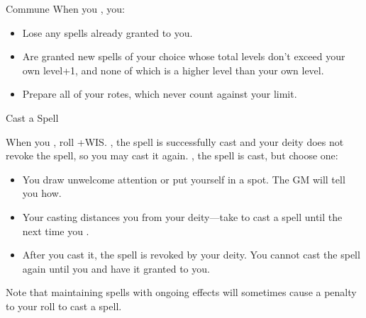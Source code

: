 \documentclass[8pt]{extarticle}
\begin{document}
\begin{minipage}[t]{4.6in}
\begin{basicmove}{Commune}
  When you , you:

  \begin{itemize}
  \item Lose any spells already granted to you.
  \item Are granted new spells of your choice whose total levels don’t
    exceed your own level+1, and none of which is a higher level than
    your own level.
  \item Prepare all of your rotes, which never count against your
    limit.
  \end{itemize}
\end{basicmove}

\begin{basicmove}{Cast a Spell}

  When you ,
  roll +WIS. \onSuccess, the spell is successfully cast and your
  deity does not revoke the spell, so you may cast it
  again. \onPartial, the spell is cast, but choose one:

  \begin{itemize}
  \item You draw unwelcome attention or put yourself in a spot. The GM
    will tell you how.
  \item Your casting distances you from your deity---take 
    to cast a spell until the next time you .
  \item After you cast it, the spell is revoked by your deity. You
    cannot cast the spell again until you  and have it
    granted to you.
  \end{itemize}

  Note that maintaining spells with ongoing effects will sometimes
  cause a penalty to your roll to cast a spell.
\end{basicmove}

\vfill\null
\end{minipage}

\charlower
\clearpage

\gearbanner
\end{document}
